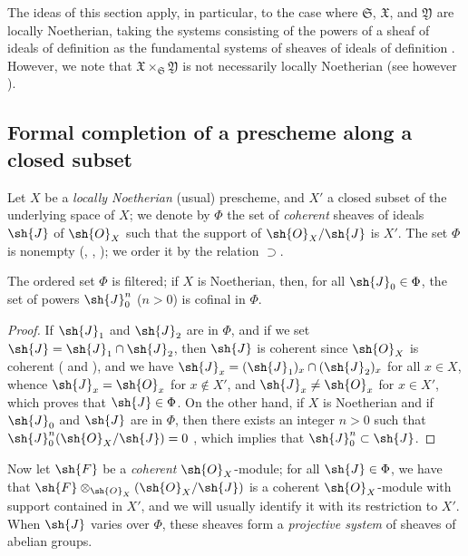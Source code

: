 \begin{env}[10.7.4]
The ideas of this section apply, in particular, to the case where $\mathfrak{S}$, $\mathfrak{X}$, and $\mathfrak{Y}$ are locally Noetherian, taking the systems consisting of the powers of a sheaf of ideals of definition  as the fundamental systems of sheaves of ideals of definition .
However, we note that $\mathfrak{X}\times_\mathfrak{S}\mathfrak{Y}$ is not necessarily locally Noetherian (see however ).
\end{env}

\subsection{Formal completion of a prescheme along a closed subset}
\label{subsection:I.10.8}

\begin{env}[10.8.1]
\label{I.10.8.1}
Let $X$ be a \emph{locally Noetherian} (usual) prescheme, and $X'$ a closed subset of the underlying space of $X$; we denote by $\Phi$ the set of \emph{coherent} sheaves of ideals $\sh{J}$ of $\sh{O}_X$ such that the support of $\sh{O}_X/\sh{J}$ is $X'$.
The set $\Phi$ is nonempty (, , ); we order it by the relation $\supset$.
\end{env}

\begin{lemma}[10.8.2]
\label{I.10.8.2}
The ordered set $\Phi$ is filtered; if $X$ is Noetherian, then, for all $\sh{J}_0\in\Phi$, the set of powers $\sh{J}_0^n$ ($n>0$) is cofinal in $\Phi$.
\end{lemma}

\begin{proof}
If $\sh{J}_1$ and $\sh{J}_2$ are in $\Phi$, and if we set $\sh{J}=\sh{J}_1\cap\sh{J}_2$, then $\sh{J}$ is coherent since $\sh{O}_X$ is coherent ( and ), and we have $\sh{J}_x=(\sh{J}_1)_x\cap(\sh{J}_2)_x$ for all $x\in X$, whence $\sh{J}_x=\sh{O}_x$ for $x\not\in X'$, and $\sh{J}_x\neq\sh{O}_x$ for $x\in X'$, which proves that $\sh{J}\in\Phi$.
On the other hand, if $X$ is Noetherian and if $\sh{J}_0$ and $\sh{J}$ are in $\Phi$, then there exists an integer $n>0$ such that $\sh{J}_0^n(\sh{O}_X/\sh{J})=0$ , which implies that $\sh{J}_0^n\subset\sh{J}$.
\end{proof}

\begin{env}[10.8.3]
\label{I.10.8.3}
Now let $\sh{F}$ be a \emph{coherent} $\sh{O}_X$-module; for all $\sh{J}\in\Phi$, we have that $\sh{F}\otimes_{\sh{O}_X}(\sh{O}_X/\sh{J})$ is a coherent $\sh{O}_X$-module  with support contained in $X'$, and we will usually identify it with its restriction to $X'$.
When $\sh{J}$ varies over $\Phi$, these sheaves form a \emph{projective system} of sheaves of abelian groups.
\end{env}

